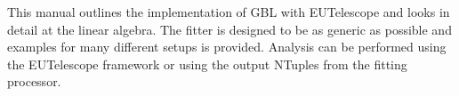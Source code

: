 This manual outlines the implementation of GBL with EUTelescope and looks in detail at the linear algebra. The fitter is designed to be as generic as possible and examples for many different setups is provided. Analysis can be performed using the EUTelescope framework or using the output NTuples from the fitting processor.




